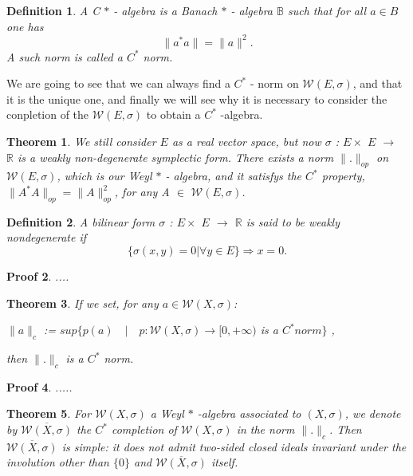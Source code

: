 \documentclass[10pt]{article} %
\numberwithin{equation}{section}
\numberwithin{equation}{section} %
\numberwithin{figure}{section} %
\newcommand{\norm}[1]{\|{#1}\|} %
\theoremstyle{theoremsf}
\newtheorem{thm}{Theorem}[section]
\newtheorem{demo}[thm]{Proof}
\theoremstyle{definitionsf}
\newtheorem{dfn}{Definition}[section]
\begin{document}
\begin{dfn}
 A C $\ast$ - algebra is a Banach $\ast$ - algebra $\mathbb{B}$ such that for all $a \in B$ one has
 \begin{equation}
  \norm{a^{\ast} a} = \norm{a}^2.
 \end{equation}
 A such norm is called a $C^\ast$ norm.
\end{dfn}

\noindent
We are going to see that we can always find a $C^\ast$ - norm on $\mathcal{W}(E,\sigma)$, and that it is the unique one, and finally we will see why it is necessary to consider the conpletion of the $\mathcal{W}(E,\sigma)$  to obtain a $C^\ast$ -algebra.

\begin{thm}
 We still consider $E$ as a real vector space, but now $\sigma$ : $E \times$ $E$  $\rightarrow$ $\mathbb{R}$ is a weakly non-degenerate symplectic form. There exists a norm $\norm{.}_{op}$ on $\mathcal{W}(E,\sigma)$, which is our Weyl $\ast$ - algebra, and it satisfys the $C^{\ast}$ property, $\norm{A^{\ast}A}_{op} = \norm{A}_{op}^2$, for any A $\in$  $\mathcal{W}(E,\sigma)$.
\end{thm}

\begin{dfn}
 A bilinear form $\sigma$ : $E \times$ $E$  $\rightarrow$ $\mathbb{R}$ is said to be weakly nondegenerate if 
 \begin{equation}
  \big\{ \sigma(x,y) = 0 | \forall y \in E \big\} \Rightarrow x = 0.
 \end{equation}
\end{dfn}

\begin{demo}
 ....
\end{demo}

\begin{thm}
 If we set, for any $a \in \mathcal{W}(X,\sigma)$:
 \begin{center}
  $\norm{a}_{c}$ := $sup \big\{ p(a) \quad | \quad p : \mathcal{W} (X, \sigma) \rightarrow [0,+\infty)$ is a $C^\ast norm \big\}$ ,
 \end{center}
 then $\norm{.}_{c}$ is a $C^\ast$ norm.
\end{thm}

\begin{demo}
 .....
\end{demo}

\begin{thm}
 For $\mathcal{W}(X,\sigma)$ a Weyl $\ast$ -algebra associated to $(X, \sigma )$, we denote by $\overline{\mathcal{W} (X, \sigma )}$ the $C^\ast$ completion of $\mathcal{W}(X,\sigma)$ in the norm $\norm{.}_{c}$. Then $\overline{\mathcal{W} (X, \sigma )}$ is simple: it does not admit two-sided closed ideals invariant under the involution other than $\{0\}$ and $\overline{\mathcal{W} (X, \sigma )}$ itself.
\end{thm}
\end{document}
